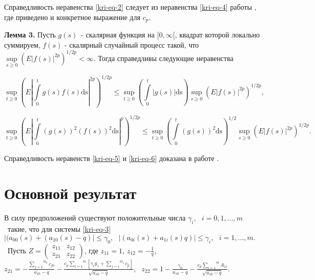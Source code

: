 Справедливость неравенства \eqref{kri-eq-2} следует из неравенства \eqref{kri-eq-4} работы \cite[стр. 65]{kri-bib-18}, где приведено и конкретное выражение для
$c_p$.

\textbf{Лемма 3.} Пусть  $g(s)$\ {}- скалярная функция на  $[0,\infty [$, квадрат которой локально суммируем,
$f(s)$ {}- скалярный случайный процесс такой, что  $\underset{s\ge 0} \sup \left(E|f(s)|^{2p}\right)^{1/2p} <\infty $. Тогда справедливы следующие неравенства

\begin{equation}\label{kri-eq-5}
	\underset{t\ge 0}\sup\left(E|\overset t{\underset 0{\int
	}}g(s)f(s)\text{ds}|^{2p}\right)^{1/2p}\le \underset{t\ge 0}\sup\left(\overset t{\underset
		0{\int }}|g(s)|\text{ds}\right)\underset{s\ge
		0}\sup\left(E|f(s)|^{2p}\right)^{1/2p},
\end{equation}

\begin{equation}\label{kri-eq-6}
	\underset{t\ge 0}\sup\left(E|\overset t{\underset 0{\int
	}}(g(s))^2(f(s))^2\text{ds}|^p\right)^{1/2p}\le \underset{t\ge 0}\sup\left(\overset
	t{\underset 0{\int }}(g(s))^2\text{ds}\right)^{1/2}\underset{s\ge
		0}\sup\left(E|f(s)|^{2p}\right)^{1/2p}.
\end{equation}

Справедливость неравенств \eqref{kri-eq-5} и \eqref{kri-eq-6} доказана в работе \cite{kri-bib-21}.

\section{Основной результат}

В силу предположений существуют положительные числа  $\gamma _i,\text{  }i=0,1,...,m$ \ такие, что для системы \eqref{kri-eq-3}
$|(a_{00}(s)+(a_{10}(s)-q)|\le \gamma _0,\text{  }|(a_{0i}(s)+a_{1i}(s)q)|\le \gamma _i,\text{  }i=1,...,m.$ \ Пусть
$Z=\left(\begin{matrix}z_{11}&z_{12}\\z_{21}&z_{22}\end{matrix}\right)$, где  $z_{11}=1$,  $z_{12}=-\frac 1 q$,
$z_{21}=-\frac{\overset{m_0}{\underset{j=1}{\sum }}c_{\mathit{j0}}}{\overline{a_{10}}-q}-\frac{c_p\overset
m{\underset{i=1}{\sum }}\left[\gamma _i\overline{y_1}+\overset{m_i}{\underset{j=1}{\sum
}}c_{\text{ji}}\right]}{\sqrt{\overline{a_{10}}-q}}$, \  $z_{22}=1-\frac{\gamma
_0}{\overline{a_{10}}-q}-\frac{c_p\overset m{\underset{i=1}{\sum }}A_{1i}}{\sqrt{\overline{a_{10}}-q}}.$

